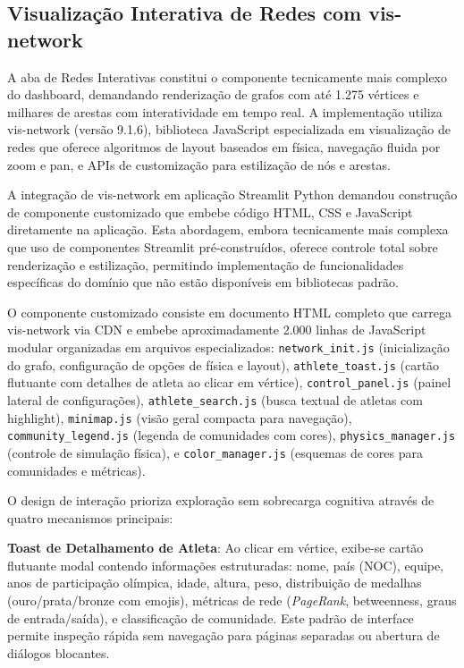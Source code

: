 \subsection{Visualização Interativa de Redes com vis-network}

A aba de Redes Interativas constitui o componente tecnicamente mais complexo do dashboard, demandando renderização de grafos com até 1.275 vértices e milhares de arestas com interatividade em tempo real. A implementação utiliza vis-network (versão 9.1.6), biblioteca JavaScript especializada em visualização de redes que oferece algoritmos de layout baseados em física, navegação fluida por zoom e pan, e APIs de customização para estilização de nós e arestas.

A integração de vis-network em aplicação Streamlit Python demandou construção de componente customizado que embebe código HTML, CSS e JavaScript diretamente na aplicação. Esta abordagem, embora tecnicamente mais complexa que uso de componentes Streamlit pré-construídos, oferece controle total sobre renderização e estilização, permitindo implementação de funcionalidades específicas do domínio que não estão disponíveis em bibliotecas padrão.

O componente customizado consiste em documento HTML completo que carrega vis-network via CDN e embebe aproximadamente 2.000 linhas de JavaScript modular organizadas em arquivos especializados: \texttt{network\_init.js} (inicialização do grafo, configuração de opções de física e layout), \texttt{athlete\_toast.js} (cartão flutuante com detalhes de atleta ao clicar em vértice), \texttt{control\_panel.js} (painel lateral de configurações), \texttt{athlete\_search.js} (busca textual de atletas com highlight), \texttt{minimap.js} (visão geral compacta para navegação), \texttt{community\_legend.js} (legenda de comunidades com cores), \texttt{physics\_manager.js} (controle de simulação física), e \texttt{color\_manager.js} (esquemas de cores para comunidades e métricas).

O design de interação prioriza exploração sem sobrecarga cognitiva através de quatro mecanismos principais:

\textbf{Toast de Detalhamento de Atleta}: Ao clicar em vértice, exibe-se cartão flutuante modal contendo informações estruturadas: nome, país (NOC), equipe, anos de participação olímpica, idade, altura, peso, distribuição de medalhas (ouro/prata/bronze com emojis), métricas de rede (\textit{PageRank}, betweenness, graus de entrada/saída), e classificação de comunidade. Este padrão de interface permite inspeção rápida sem navegação para páginas separadas ou abertura de diálogos blocantes.

